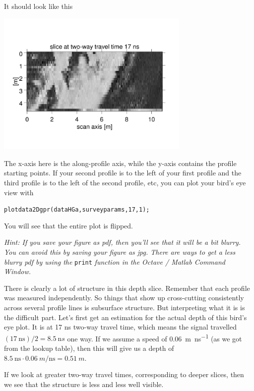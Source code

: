 \documentclass[11pt]{article}
\begin{document}
It should look like this
\begin{center}
\includegraphics[width=0.7\textwidth, trim = 1cm 3cm 1cm
  3cm,clip]{figures/Area17ns.jpg}
\end{center}

The x-axis here is the along-profile axis, while the y-axis contains
the profile starting points. If your second profile is to the left of
your first profile and the third profile is to the left of the second
profile, etc, you can plot your bird's eye view with

\qquad \verb#plotdata2Dgpr(dataHGa,surveyparams,17,1);#

You will see that the entire plot is flipped.

\emph{Hint: If you save your figure as pdf, then you'll see that it will be
a bit blurry. You can avoid this by saving your figure as jpg. There
are ways to get a less blurry pdf by using the} \verb#print# \emph{function
in the Octave / Matlab Command Window.}

There is clearly a lot of structure in this depth slice. Remember that
each profile was measured independently. So things that show up
cross-cutting consistently across several profile lines is subsurface
structure. But interpreting what it is is the difficult part. Let's
first get an estimation for the actual depth of this bird's eye
plot. It is at 17 ns two-way travel time, which means the signal
travelled $(\SI{17}{\ns}) / 2 = \SI{8.5}{\nano s}$ one way. If we
assume a speed of \SI{0.06}{m\per\ns} (as we got from the lookup
table), then this will give us a depth of $\SI{8.5}{\ns} \cdot
\SI{0.06}{m\per\ns} = \SI{0.51}{m}$.

If we look at greater two-way travel times, corresponding to deeper
slices, then we see that the structure is less and less well
visible.
\end{document}
